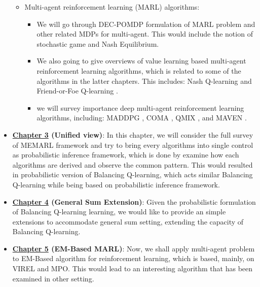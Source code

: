 \begin{itemize}
\begin{itemize}
        \item Multi-agent reinforcement learning (MARL) algorithms: 
        \begin{itemize}
            \item We will go through DEC-POMDP \cite{bernstein2002complexity} formulation of MARL problem and other related MDPs for multi-agent. This would include the notion of stochastic game and Nash Equilibrium.
            \item We also going to give overviews of value learning based multi-agent reinforcement learning algorithms, which is related to some of the algorithms in the latter chapters. This includes: Nash Q-learning \cite{hu2003nash} and Friend-or-Foe Q-learning \cite{littman2001friend}.
            \item we will survey importance deep multi-agent reinforcement learning algorithms, including: MADDPG \cite{lowe2017multi}, COMA \cite{foerster2018counterfactual}, QMIX \cite{rashid2018qmix}, and MAVEN \cite{mahajan2019maven}. 
        \end{itemize}
    \end{itemize}
    \item \textbf{\hyperref[chapter:chap3]{Chapter 3} (Unified view)}: In this chapter, we will consider the full survey of MEMARL framework and try to bring every algorithms into single control as probabilistic inference framework, which is done by examine how each algorithms are derived  and observe the common pattern. This would resulted in probabilistic version of Balancing Q-learning, which acts similar Balancing Q-learning while being based on probabilistic inference framework.
    \item \textbf{\hyperref[chapter:chap4]{Chapter 4} (General Sum Extension)}: Given the probabilistic formulation of Balancing Q-learning learning, we would like to provide an simple extensions to accommodate general sum setting, extending the capacity of Balancing Q-learning.
    \item \textbf{\hyperref[chapter:chap5]{Chapter 5} (EM-Based MARL)}: Now, we shall apply multi-agent problem to EM-Based algorithm for reinforcement learning, which is based, mainly, on VIREL and MPO. This would lead to an interesting algorithm that has been examined in other setting. 

\end{itemize}
